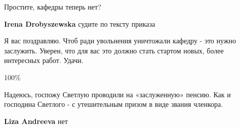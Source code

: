 \begin{itemize}
 
Простите, кафедры теперь нет?

\begin{itemize}
 
\textbf{Irena Drobyszewska} судите по тексту приказа
\end{itemize}

 

Я вас поздравляю. Чтоб ради увольнения уничтожали кафедру - это нужно
заслужить. Уверен, что для вас это должно стать стартом новых, более интересных
работ. Удачи.

\begin{itemize}
 
100\%
\end{itemize}

 

Надеюсь, госпожу Светлую проводили на «заслуженную» пенсию. Как и господина
Светлого - с утешительным призом в виде звания членкора.

\begin{itemize}
 
\textbf{Liza Andreeva} нет

 

\end{itemize}
\end{itemize}
